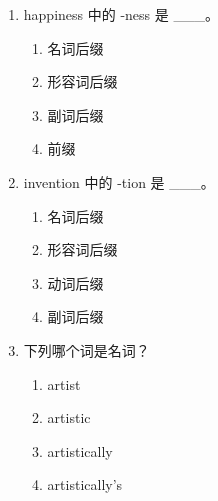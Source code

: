 \documentclass[11pt,a4paper]{ctexart}
\begin{document}
\begin{enumerate}[leftmargin=*,itemsep=4pt]
\begin{enumerate}[label=\Alph*.,leftmargin=2em,itemsep=1pt,topsep=2pt]
\item dangerous
\end{enumerate}
\item happiness 中的 -ness 是 \_\_\_。
\begin{enumerate}[label=\Alph*.,leftmargin=2em,itemsep=1pt,topsep=2pt]
\item 名词后缀
\item 形容词后缀
\item 副词后缀
\item 前缀
\end{enumerate}
\item invention 中的 -tion 是 \_\_\_。
\begin{enumerate}[label=\Alph*.,leftmargin=2em,itemsep=1pt,topsep=2pt]
\item 名词后缀
\item 形容词后缀
\item 动词后缀
\item 副词后缀
\end{enumerate}
\item 下列哪个词是名词？
\begin{enumerate}[label=\Alph*.,leftmargin=2em,itemsep=1pt,topsep=2pt]
\item artist
\item artistic
\item artistically
\item artistically’s
\end{enumerate}
\end{enumerate}
\end{document}
